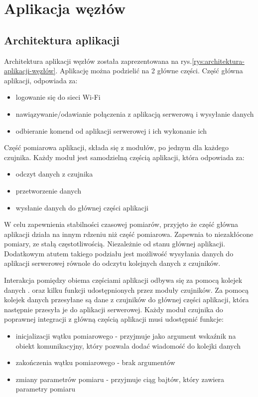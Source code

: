 \documentclass[12pt,oneside,a4paper]{book}
\theoremstyle{break}
\begin{document}
\chapter{Aplikacja węzłów}
\section{Architektura aplikacji}
Architektura aplikacji węzłów została zaprezentowana na rys.\ref{rys:architektura-aplikacji-węzłów}.
Aplikację można podzielić na 2 główne części. Część główna aplikacji, odpowiada za:

\begin{itemize}
    \item logowanie się do sieci Wi-Fi
    \item nawiązywanie/odawianie połączenia z aplikacją serwerową i wysyłanie danych
    \item odbieranie komend od aplikacji serwerowej i ich wykonanie ich
\end{itemize}

Część pomiarowa aplikacji, składa się z modułów, po jednym dla każdego czujnika.
Każdy moduł jest samodzielną częścią aplikacji, która odpowiada za:

\begin{itemize}
    \item odczyt danych z czujnika
    \item przetworzenie danych
    \item wysłanie danych do głównej części aplikacji
\end{itemize}

W celu zapewnienia stabilności czasowej pomiarów, przyjęto że część główna aplikacji
działa na innym rdzeniu niż część pomiarowa. Zapewnia to niezakłócone pomiary, ze stałą częstotliwością.
Niezależnie od stanu głównej aplikacji. Dodatkowym atutem takiego podziału jest możliwość wysyłania danych
do aplikacji serwerowej równole do odczytu kolejnych danych z czujników. 
\par Interakcja pomiędzy obiema częściami aplikacji odbywa się za pomocą kolejek danych \cite{wiki-queue}.
oraz kilku funkcji udostępnionych przez moduły czujników. Za pomocą kolejek danych przesyłane są dane z czujników
do głównej części aplikacji, która następnie przesyła je do aplikacji serwerowej. Każdy moduł czujnika 
do poprawnej integracji z główną częścią aplikacji musi udostępnić funkcje:

\begin{itemize}
    \item inicjalizacji wątku pomiarowego - przyjmuje jako argument wskaźnik na 
    obiekt komunikacyjny, który pozwala dodać wiadomość do kolejki danych
    \item zakończenia wątku pomiarowego - brak argumentów
    \item zmiany parametrów pomiaru - przyjmuje ciąg bajtów, który zawiera parametry pomiaru
\end{itemize}
\end{document}
